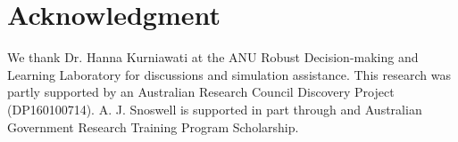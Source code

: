 \documentclass[letterpaper, 10 pt, conference]{ieeeconf}
\begin{document}









\section*{Acknowledgment}

We thank Dr. Hanna Kurniawati at the ANU Robust Decision-making and Learning Laboratory for discussions and simulation assistance.
This research was partly supported by an Australian Research Council Discovery Project (DP160100714).
A. J. Snoswell is supported in part through and Australian Government Research Training Program Scholarship. 








\end{document}
